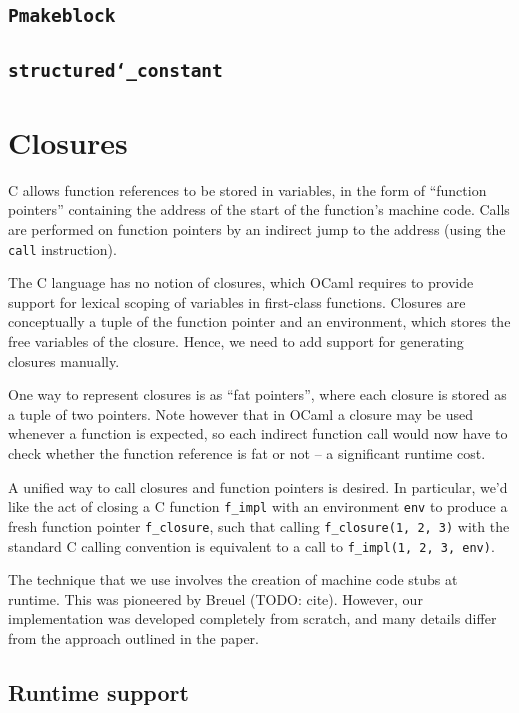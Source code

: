 \documentclass[12pt,a4paper,twoside,openright]{report}
\begin{document}
\subsection{\texttt{Pmakeblock}}

\subsection{\texttt{structured\char`_constant}}

\section{Closures}

C allows function references to be stored in variables, in the form of
``function pointers'' containing the address of the start of the function's
machine code. Calls are performed on function pointers by an indirect jump to
the address (using the \lstinline!call! instruction).

The C language has no notion of closures, which OCaml requires to provide
support for lexical scoping of variables in first-class functions. Closures are
conceptually a tuple of the function pointer and an environment, which stores
the free variables of the closure. Hence, we need to add support for generating
closures manually.

One way to represent closures is as ``fat pointers'', where each closure is
stored as a tuple of two pointers. Note however that in OCaml a closure may be
used whenever a function is expected, so each indirect function call would now
have to check whether the function reference is fat or not -- a significant
runtime cost.

A unified way to call closures and function pointers is desired. In
particular, we'd like the act of closing a C function \lstinline!f_impl! with
an environment \lstinline!env! to produce a fresh function pointer
\lstinline!f_closure!, such that calling
\lstinline!f_closure(1, 2, 3)!
with the standard C calling convention is equivalent to a call to
\lstinline!f_impl(1, 2, 3, env)!.

The technique that we use involves the creation of machine code stubs at
runtime. This was pioneered by Breuel (TODO: cite). However, our implementation
was developed completely from scratch, and many details differ from the
approach outlined in the paper.

\subsection{Runtime support}
\end{document}
